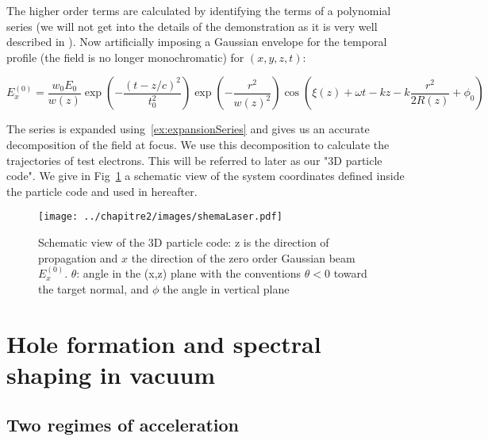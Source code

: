 \noindent The higher order terms are calculated by identifying the terms of a polynomial series (we will not get into the details of the demonstration as it is very well described in \cite{quesnel1998theory}). Now artificially imposing a Gaussian envelope for the temporal profile (the field is no longer monochromatic) for $(x,y,z,t)$:



\begin{equation}
E_x^{(0)}  = \frac{w_0 E_0}{w(z)}\exp (-\frac{(t-z/c)^2}{t_0^2})\exp (-\frac{r^2}{w(z)^2})\cos(\xi(z) +\omega t - k z - k\frac{r^2}{2R(z)}+\phi_0)
\end{equation}

The series is expanded using~\ref{ex:expansionSeries} and gives us an accurate decomposition of the field at focus. We use this decomposition to calculate the trajectories of test electrons. This will be referred to later as our "3D particle code". We give in Fig~\ref{fig:shemaLaser} a schematic view of the system coordinates defined inside the particle code and used in hereafter.



\begin{figure}[H]
\begin{center}
\texttt{[image: ../chapitre2/images/shemaLaser.pdf]}
\caption{\label{fig:shemaLaser}Schematic view of the 3D particle code: z is the direction of propagation and $x$ the direction of the zero order Gaussian beam $E_x^{(0)}$. $\theta$: angle in the (x,z) plane with the conventions $\theta<0$ toward the target normal, and $\phi$ the angle in vertical plane}
\end{center}
\end{figure}






\section{Hole formation and spectral shaping in vacuum}




\subsection{Two regimes of acceleration}\label{Two acceleration regime confirmation with 3D particle code}

